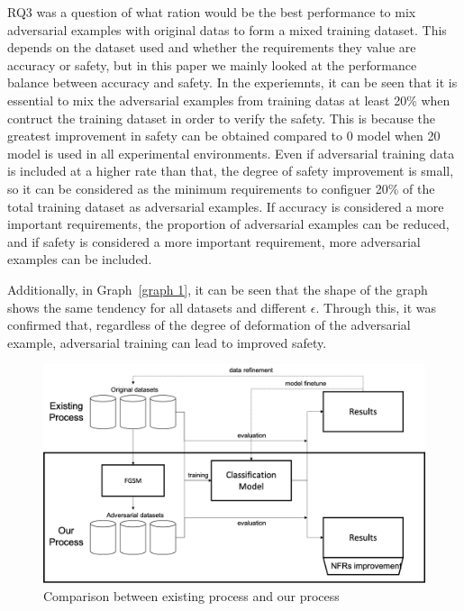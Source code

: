 \documentclass[journal,article,submit,moreauthors,pdftex]{Definitions/mdpi}
\begin{document}
RQ3 was a question of what ration would be the best performance to mix adversarial examples with original datas to form a mixed training dataset.
This depends on the dataset used and whether the requirements they value are accuracy or safety, but in this paper we mainly looked at the performance balance between accuracy and safety.
In the experiemnts, it can be seen that it is essential to mix the adversarial examples from training datas at least 20\% when contruct the training dataset in order to verify the safety.
This is because the greatest improvement in safety can be obtained compared to 0 model when 20 model is used in all experimental environments.
Even if adversarial training data is included at a higher rate than that, the degree of safety improvement is small, so it can be considered as the minimum requirements to configuer 20\% of the total training dataset as adversarial examples.
If accuracy is considered a more important requirements, the proportion of adversarial examples can be reduced, and if safety is considered a more important requirement, more adversarial examples can be included.

Additionally, in Graph~\ref{graph 1}, it can be seen that the shape of the graph shows the same tendency for all datasets and different \begin{math}\epsilon\end{math}.
Through this, it was confirmed that, regardless of the degree of deformation of the adversarial example, adversarial training can lead to improved safety.

\begin{figure}[H]
    \includegraphics[width=13 cm]{Definitions/comparison.png}
    \caption{Comparison between existing process and our process\label{comparison}}
\end{figure} 
\end{document}
